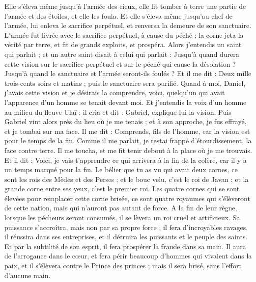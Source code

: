 \begin{multicols}{2}
Elle s'éleva même jusqu'à l'armée des cieux, elle fit tomber à terre une partie de l'armée et des étoiles, et elle les foula.
Et elle s'éleva même jusqu'au chef de l'armée, lui enleva le sacrifice perpétuel, et renversa la demeure de son sanctuaire.
L'armée fut livrée avec le sacrifice perpétuel, à cause du péché ; la corne jeta la vérité par terre, et fit de grands exploits, et prospéra.
Alors j'entendis un saint qui parlait ; et un autre saint disait à celui qui parlait : Jusqu'à quand durera cette vision sur le sacrifice perpétuel et sur le péché qui cause la désolation ? Jusqu'à quand le sanctuaire et l'armée seront-ils foulés ?
Et il me dit : Deux mille trois cents soirs et matins ; puis le sanctuaire sera purifié.
Quand à moi, Daniel, j'avais cette vision et je désirais la comprendre, voici, quelqu'un qui avait l'apparence d'un homme se tenait devant moi.
Et j'entendis la voix d'un homme au milieu du fleuve Ulaï ; il cria et dit : Gabriel, explique-lui la vision.
Puis Gabriel vint alors près du lieu où je me tenais ; et à son approche, je fus effrayé, et je tombai sur ma face. Il me dit : Comprends, fils de l'homme, car la vision est pour le temps de la fin.
Comme il me parlait, je restai frappé d'étourdissement, la face contre terre. Il me toucha, et me fit tenir debout à la place où je me trouvais.
Et il dit : Voici, je vais t'apprendre ce qui arrivera à la fin de la colère, car il y a un temps marqué pour la fin.
Le bélier que tu as vu qui avait deux cornes, ce sont les rois des Mèdes et des Perses ;
et le bouc velu, c'est le roi de Javan ; et la grande corne entre ses yeux, c'est le premier roi.
Les quatre cornes qui se sont élevées pour remplacer cette corne brisée, ce sont quatre royaumes qui s'élèveront de cette nation, mais qui n'auront pas autant de force.
A la fin de leur règne, lorsque les pécheurs seront consumés, il se lèvera un roi cruel et artificieux.
Sa puissance s'accroîtra, mais non par sa propre force ; il fera d'incroyables ravages, il réussira dans ses entreprises, et il détruira les puissants et le peuple des saints.
Et par la subtilité de son esprit, il fera prospérer la fraude dans sa main. Il aura de l'arrogance dans le cœur, et fera périr beaucoup d'hommes qui vivaient dans la paix, et il s'élèvera contre le Prince des princes ; mais il sera brisé, sans l'effort d'aucune main.

\end{multicols}
